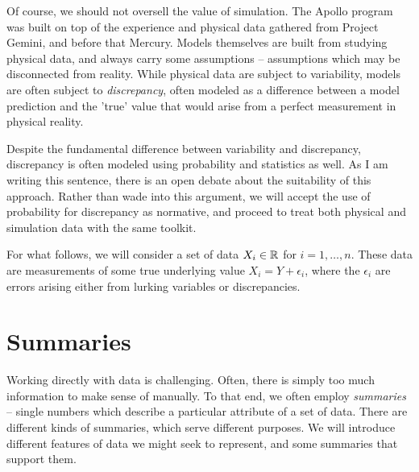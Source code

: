 \documentclass[../primer.tex]{subfiles}
\begin{document}
Of course, we should not oversell the value of simulation. The Apollo program
was built on top of the experience and physical data gathered from Project
Gemini, and before that Mercury. Models themselves are built from studying
physical data, and always carry some assumptions -- assumptions which may be
disconnected from reality. While physical data are subject to variability,
models are often subject to \emph{discrepancy}, often modeled as a difference
between a model prediction and the 'true' value that would arise from a perfect
measurement in physical reality.\cite{higdon2004calibration-prediction}

Despite the fundamental difference between variability and discrepancy,
discrepancy is often modeled using probability and statistics as
well.\cite{kennedy2001bayesian,higdon2004calibration-prediction} As I am writing
this sentence, there is an open debate about the suitability of this approach.
Rather than wade into this argument, we will accept the use of probability for
discrepancy as normative, and proceed to treat both physical and simulation data
with the same toolkit.

For what follows, we will consider a set of data $X_i\in\mathbb{R}^{}$ for $i =
1,\dots,n$. These data are measurements of some true underlying value $X_i = Y +
\epsilon_i$, where the $\epsilon_i$ are errors arising either from lurking
variables or discrepancies.

\section{Summaries}

Working directly with data is challenging. Often, there is simply too much
information to make sense of manually. To that end, we often employ
\emph{summaries} -- single numbers which describe a particular attribute of a
set of data. There are different kinds of summaries, which serve different
purposes. We will introduce different features of data we might seek to
represent, and some summaries that support them.

\end{document}
